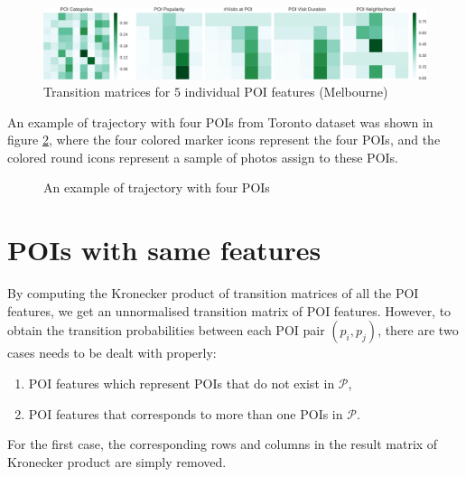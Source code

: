 \begin{figure}
\includegraphics[width=\textwidth]{fig/poi_transmat.png}
\caption{Transition matrices for $5$ individual POI features (Melbourne)}
\label{fig:transmat}
\end{figure}

An example of trajectory with four POIs from Toronto dataset was shown in figure \ref{fig:traj},
where the four colored marker icons represent the four POIs,
and the colored round icons represent a sample of photos assign to these POIs.


\begin{figure}
\centering
{}
\caption{An example of trajectory with four POIs}
\label{fig:traj}
\end{figure}



\section{POIs with same features}


By computing the Kronecker product of transition matrices of all the POI features,
we get an unnormalised transition matrix of POI features.
However, to obtain the transition probabilities between each POI pair $(p_i, p_j)$,
there are two cases needs to be dealt with properly:
\begin{enumerate}
\item POI features which represent POIs that do not exist in $\mathcal{P}$,
\item POI features that corresponds to more than one POIs in $\mathcal{P}$.
\end{enumerate}

For the first case,
the corresponding rows and columns in the result matrix of Kronecker product are simply removed.

